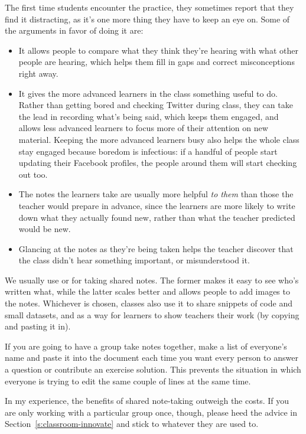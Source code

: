 The first time students encounter the practice, they sometimes report
that they find it distracting, as it's one more thing they have to keep
an eye on. Some of the arguments in favor of doing it are:

\begin{itemize}
\item
  It allows people to compare what they think they're hearing with
  what other people are hearing, which helps them fill in gaps and
  correct misconceptions right away.
\item
  It gives the more advanced learners in the class something useful to
  do. Rather than getting bored and checking Twitter during class,
  they can take the lead in recording what's being said, which keeps
  them engaged, and allows less advanced learners to focus more of
  their attention on new material. Keeping the more advanced learners
  busy also helps the whole class stay engaged because boredom is
  infectious: if a handful of people start updating their Facebook
  profiles, the people around them will start checking out too.
\item
  The notes the learners take are usually more helpful \emph{to them} than
  those the teacher would prepare in advance, since the learners are
  more likely to write down what they actually found new, rather than
  what the teacher predicted would be new.
\item
  Glancing at the notes as they're being taken helps the teacher
  discover that the class didn't hear something important, or
  misunderstood it.
\end{itemize}

We usually use  or  for
taking shared notes. The former makes it easy to see who's written
what, while the latter scales better and allows people to add images
to the notes. Whichever is chosen, classes also use it to share
snippets of code and small datasets, and as a way for learners to show
teachers their work (by copying and pasting it in).

If you are going to have a group take notes together, make a list of
everyone's name and paste it into the document each time you want every
person to answer a question or contribute an exercise solution. This
prevents the situation in which everyone is trying to edit the same
couple of lines at the same time.

In my experience, the benefits of shared note-taking outweigh the costs.
If you are only working with a particular group once, though, please
heed the advice in Section~\ref{s:classroom-innovate} and stick to
whatever they are used to.

